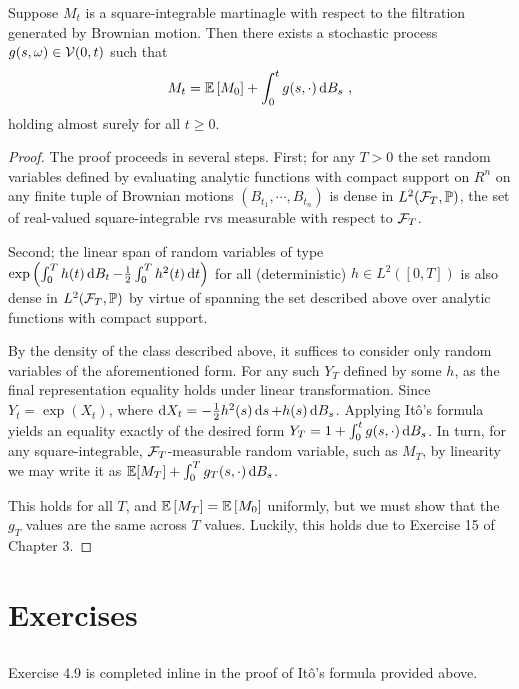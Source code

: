 \documentclass{article}
\begin{document}
\begin{theorem}
  Suppose \(M_t\) is a square-integrable martinagle with respect to the filtration generated by Brownian motion. Then there exists a stochastic process \(g(s,\omega)\in \mathcal{V}(0, t)\) such that
  \[
    M_t=\operatorname{\mathbb{E}}\left[{M_0}\right]+\int_0^tg(s,\cdot)\mathop{\mathrm{d} B_s }\,\,,
  \]
  holding almost surely for all \(t\ge 0\). 
\end{theorem}
\begin{proof}
  The proof proceeds in several steps. First; for any \(T>0\) the set random variables defined by evaluating analytic functions with compact support on \(R^n\) on any finite tuple of Brownian motions \((B_{t_1},\cdots,B_{t_n})\) is dense in \(L^2(\mathcal{F}_T,\operatorname{\mathbb{P}})\), the set of real-valued square-integrable rvs measurable with respect to \(\mathcal{F}_T\).

  Second; the linear span of random variables of type \(\exp\left({\int_0^Th(t)\mathop{\mathrm{d} B_t }-\frac{1}{2}\int_0^Th^2(t)\mathop{\mathrm{d} t }}\right)\) for all (deterministic) \(h\in L^2([0,T])\) is also dense in \(L^2(\mathcal{F}_T, \operatorname{\mathbb{P}})\) by virtue of spanning the set described above over analytic functions with compact support.

  By the density of the class described above, it suffices to consider only random variables of the aforementioned form. For any such \(Y_T\) defined by some \(h\), as the final representation equality holds under linear transformation. Since \(Y_t=\exp(X_t)\), where \(\mathop{\mathrm{d} X_t }=-\frac{1}{2}h^2(s)\mathop{\mathrm{d} s }+h(s)\mathop{\mathrm{d} B_s }\). Applying It\^{o}'s formula yields an equality exactly of the desired form \(Y_T=1 + \int_0^tg(s,\cdot)\mathop{\mathrm{d} B_s }\). In turn, for any square-integrable, \(\mathcal{F}_T\)-measurable random variable, such as \(M_T\), by linearity we may write it as \(\operatorname{\mathbb{E}}[M_T]+\int_0^Tg_{T}(s,\cdot)\mathop{\mathrm{d} B_s }\).

  This holds for all \(T\), and \(\operatorname{\mathbb{E}}\left[{M_T}\right]=\operatorname{\mathbb{E}} \left[{M_0}\right]\) uniformly, but we must show that the \(g_T\) values are the same across \(T\) values. Luckily, this holds due to Exercise 15 of Chapter 3.
  \end{proof}


\section{Exercises}

\subsection{}

Exercise 4.9 is completed inline in the proof of It\^{o}'s formula provided above.
\end{document}
